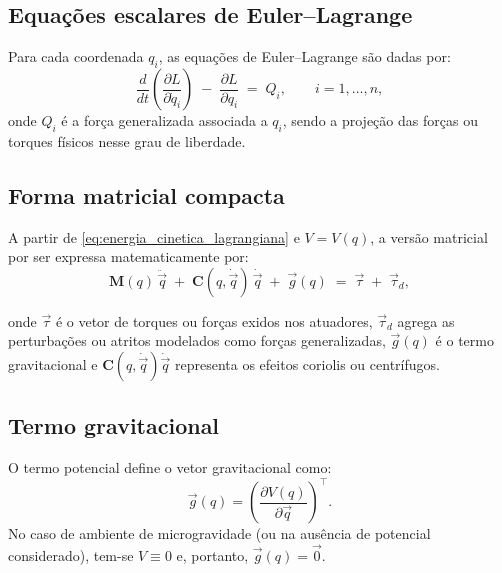 \subsection{Equações escalares de Euler--Lagrange}
Para cada coordenada $q_i$, as equações de Euler--Lagrange são dadas por:
\begin{equation}
\frac{d}{dt}\!\left(\frac{\partial L}{\partial \dot q_i}\right) \;-\; \frac{\partial L}{\partial q_i}
\;=\; Q_i,
\qquad i=1,\dots,n,
\label{eq:EL_componentes}
\end{equation}
onde $Q_i$ é a força generalizada associada a $q_i$, sendo a projeção das forças ou torques físicos nesse grau de liberdade.

\subsection{Forma matricial compacta}
A partir de \eqref{eq:energia_cinetica_lagrangiana} e $V=V(q)$, a versão matricial por ser expressa matematicamente por:
\begin{equation}
\mathbf M(q)\,\ddot{\vec q} \;+\; \mathbf C(q,\dot{\vec q})\,\dot{\vec q} \;+\; \vec g(q)
\;=\; \vec \tau \;+\; \vec \tau_{\!d},
\label{eq:EL_compacta}
\end{equation}

onde $\vec\tau$ é o vetor de torques ou forças exidos nos atuadores,
$\vec \tau_{\!d}$ agrega as perturbações ou atritos modelados como forças generalizadas,
$\vec g(q)$ é o termo gravitacional e
$\mathbf C(q,\dot{\vec q})\dot{\vec q}$ representa os efeitos coriolis ou centrífugos.

\subsection{Termo gravitacional}
O termo potencial define o vetor gravitacional como:
\begin{equation}
\vec g(q)=
\left(\frac{\partial V(q)}{\partial \vec q}\right)^{\!\top}.
\label{eq:g_def}
\end{equation}
No caso de ambiente de microgravidade (ou na ausência de potencial considerado), tem-se $V\equiv 0$ e, portanto, $\vec g(q)=\vec 0$.


